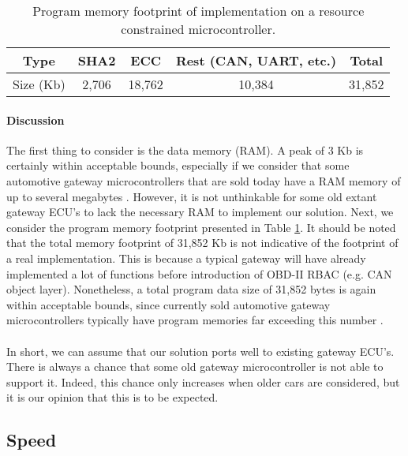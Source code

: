 \begin{table}[]
	\centering
	\begin{tabular}{|c|c|c|c||c|}
		\hline
		\rowcolor[HTML]{9B9B9B} Type & SHA2 & ECC & Rest (CAN, UART, etc.) & Total \\ \hline
		\cellcolor[HTML]{9B9B9B} Size (Kb) & \cellcolor[HTML]{FFFFFF} 2,706 & 18,762 & 10,384 & 31,852 \\ \hline
	\end{tabular}
	\caption{Program memory footprint of implementation on a resource constrained microcontroller.}
	\label{table:portability}
\end{table}

\paragraph{Discussion} The first thing to consider is the data memory (RAM). A peak of 3 Kb is certainly within acceptable bounds, especially if we consider that some automotive gateway microcontrollers that are sold today have a RAM memory of up to several megabytes \cite{GatewayInfineon,GatewayST}. However, it is not unthinkable for some old extant gateway ECU's to lack the necessary RAM to implement our solution. Next, we consider the program memory footprint presented in Table \ref{table:portability}. It should be noted that the total memory footprint of 31,852 Kb is not indicative of the footprint of a real implementation. This is because a typical gateway will have already implemented a lot of functions before introduction of OBD-II RBAC (e.g. CAN object layer). Nonetheless, a total program data size of 31,852 bytes is again within acceptable bounds, since currently sold automotive gateway microcontrollers typically have program memories far exceeding this number \cite{GatewayInfineon,GatewayAtmel,GatewayST}. \\ \\ In short, we can assume that our solution ports well to existing gateway ECU's. There is always a chance that some old gateway microcontroller is not able to support it. Indeed, this chance only increases when older cars are considered, but it is our opinion that this is to be expected.  


\subsection{Speed}
\label{sec:speed}

